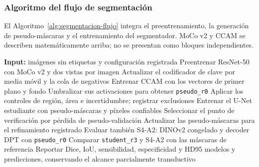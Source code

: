 \subsubsection{Algoritmo del flujo de segmentación}

El Algoritmo~\ref{alg:segmentacion-flujo} integra el preentrenamiento, la generación de pseudo-máscaras y el entrenamiento del segmentador. MoCo v2 y CCAM se describen matemáticamente arriba; no se presentan como bloques independientes.

\begin{algorithm}[!htbp]
\fontsize{11}{13}\selectfont\singlespacing
\caption{Flujo de segmentación con pseudo-máscaras}
\label{alg:segmentacion-flujo}
\label{alg:mocov2}
\label{alg:ccam}
\begin{algorithmic}[1]
\State \textbf{Input:} imágenes sin etiquetas y configuración registrada
\State Preentrenar ResNet-50 con MoCo v2 y dos vistas por imagen
\State Actualizar el codificador de clave por media móvil y la cola de negativos
\State Entrenar CCAM con los vectores de primer plano y fondo
\State Umbralizar sus activaciones para obtener \texttt{pseudo\_r0}
\State Aplicar los controles de región, área e incertidumbre; registrar exclusiones
 \State Entrenar el U-Net estudiante con pseudo-máscaras y píxeles confiables
 \State Seleccionar el punto de verificación por pérdida de pseudo-validación
 \State Actualizar las pseudo-máscaras para el refinamiento registrado
\EndFor
\State Evaluar también S4-A2: DINOv2 congelado y decoder DPT con \texttt{pseudo\_r0}
\State Comparar \texttt{student\_r3} y S4-A2 con las máscaras de referencia
\State Reportar Dice, IoU, sensibilidad, especificidad y HD95
\State \Return modelos y predicciones, conservando el alcance parcialmente transductivo
\end{algorithmic}
\end{algorithm}

